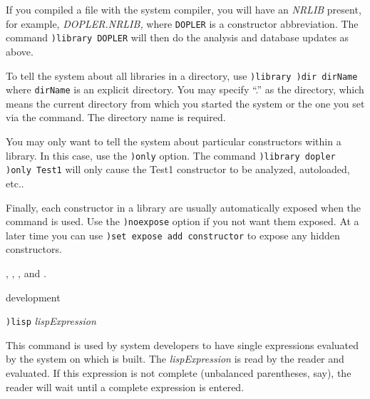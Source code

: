 {{{{{{{If you compiled a file with the \Language{} system compiler, you will
have an {\it NRLIB} present, for example, {\it DOPLER.NRLIB,}
where {\tt DOPLER} is a constructor abbreviation.
The command {\tt )library DOPLER} will then do the analysis and
database updates as above.

To tell the system about all libraries in a directory, use
{\tt )library )dir dirName} where {\tt dirName} is an explicit
directory.
You may specify ``.'' as the directory, which means the current
directory from which you started the system or the one you set
via the  command. The directory name is required.

You may only want to tell the system about particular
constructors within a library. In this case, use the {\tt )only}
option. The command {\tt )library dopler )only Test1} will only
cause the {\sf Test1} constructor to be analyzed, autoloaded,
etc..

Finally, each constructor in a library  are usually automatically exposed when the
 command is used. Use the {\tt )noexpose}
option if you not want them exposed. At a later time you can use
{\tt )set expose add constructor} to expose any hidden
constructors.

\par{}
,
,
, and
.



\par{} development

\par{}
\begin{simpleList}
\item {\tt )lisp} {\it\lanb{}lispExpression\ranb{}}
\end{simpleList}

\par{}

This command is used by \Language{} system developers to have single
expressions evaluated by the \Lisp{} system on which
\Language{} is built.
The {\it lispExpression} is read by the \Lisp{} reader and
evaluated.
If this expression is not complete (unbalanced parentheses, say), the reader
will wait until a complete expression is entered.

}}}}}}}
